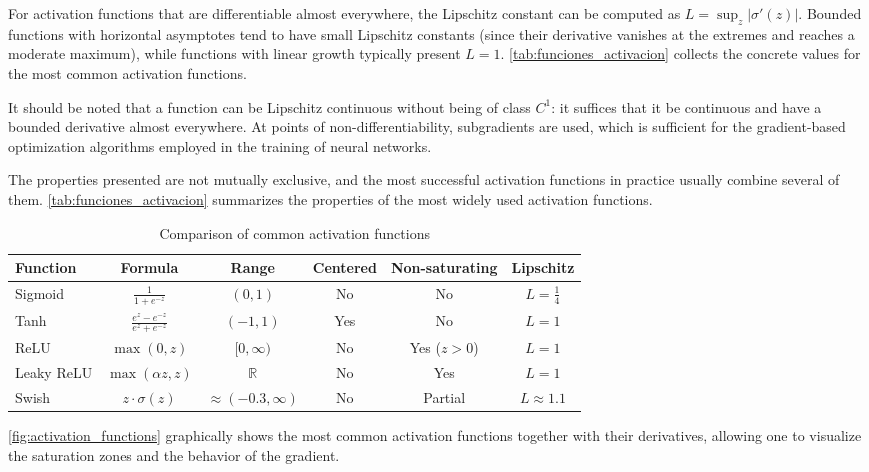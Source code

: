 For activation functions that are differentiable almost everywhere, the Lipschitz constant can be computed as $L = \sup_{z} |\sigma'(z)|$. Bounded functions with horizontal asymptotes tend to have small Lipschitz constants (since their derivative vanishes at the extremes and reaches a moderate maximum), while functions with linear growth typically present $L = 1$. \autoref{tab:funciones_activacion} collects the concrete values for the most common activation functions.

It should be noted that a function can be Lipschitz continuous without being of class $C^1$: it suffices that it be continuous and have a bounded derivative almost everywhere. At points of non-differentiability, subgradients are used, which is sufficient for the gradient-based optimization algorithms employed in the training of neural networks.

The properties presented are not mutually exclusive, and the most successful activation functions in practice usually combine several of them. \autoref{tab:funciones_activacion} summarizes the properties of the most widely used activation functions.

\begin{table}[h]
\centering
\caption{Comparison of common activation functions}
\label{tab:funciones_activacion}
\begin{tabular}{@{}lccccc@{}}
\toprule
\textbf{Function} & \textbf{Formula} & \textbf{Range} & \textbf{Centered} & \textbf{Non-saturating} & \textbf{Lipschitz} \\
\midrule
Sigmoid & $\frac{1}{1+e^{-z}}$ & $(0,1)$ & No & No & $L=\frac{1}{4}$ \\
\addlinespace
Tanh & $\frac{e^z-e^{-z}}{e^z+e^{-z}}$ & $(-1,1)$ & Yes & No & $L=1$ \\
\addlinespace
ReLU & $\max(0,z)$ & $[0,\infty)$ & No & Yes ($z>0$) & $L=1$ \\
\addlinespace
Leaky ReLU & $\max(\alpha z,z)$ & $\mathbb{R}$ & No & Yes & $L=1$ \\
\addlinespace
Swish & $z \cdot \sigma(z)$ & $\approx(-0.3,\infty)$ & No & Partial & $L\approx 1.1$ \\
\bottomrule
\end{tabular}
\end{table}

\autoref{fig:activation_functions} graphically shows the most common activation functions together with their derivatives, allowing one to visualize the saturation zones and the behavior of the gradient.

